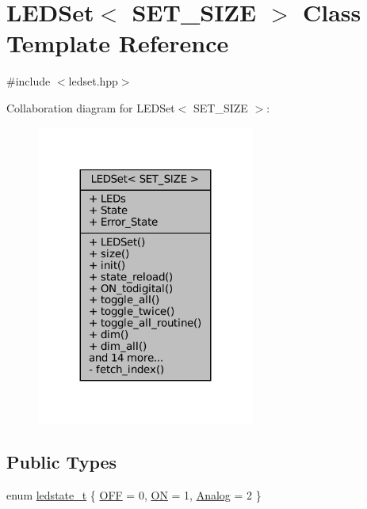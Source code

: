 \hypertarget{classLEDSet}{}\section{L\+E\+D\+Set$<$ S\+E\+T\+\_\+\+S\+I\+ZE $>$ Class Template Reference}
\label{classLEDSet}


{\ttfamily \#include $<$ledset.\+hpp$>$}



Collaboration diagram for L\+E\+D\+Set$<$ S\+E\+T\+\_\+\+S\+I\+ZE $>$\+:\nopagebreak
\begin{figure}[H]
\begin{center}
\leavevmode
\includegraphics[width=203pt]{d2/d3e/classLEDSet__coll__graph}
\end{center}
\end{figure}
\subsection*{Public Types}
\begin{DoxyCompactItemize}
\item 
enum \hyperlink{classLEDSet_ae26a13b2d33c51351bc6d0acdf2a94a4}{ledstate\+\_\+t} \{ \hyperlink{classLEDSet_ae26a13b2d33c51351bc6d0acdf2a94a4a786545571f352fd284991e5fcdb79238}{O\+FF} = 0, 
\hyperlink{classLEDSet_ae26a13b2d33c51351bc6d0acdf2a94a4a1e073152d5525648a5bb26cf3eb98ea2}{ON} = 1, 
\hyperlink{classLEDSet_ae26a13b2d33c51351bc6d0acdf2a94a4a2c0806958e37c8d87bd57df8990b30eb}{Analog} = 2
 \}
\end{DoxyCompactItemize}
